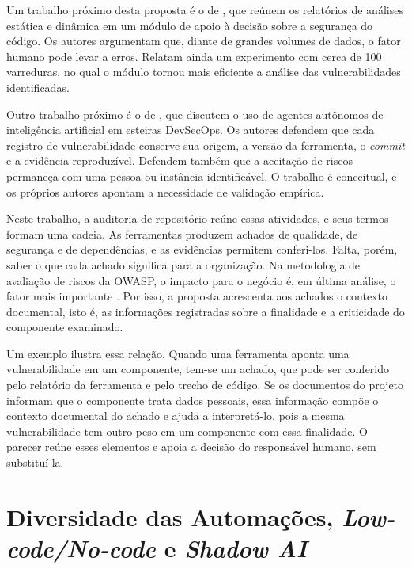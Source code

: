 Um trabalho próximo desta proposta é o de , que reúnem os relatórios de análises estática e dinâmica em um módulo de apoio à decisão sobre a segurança do código. Os autores argumentam que, diante de grandes volumes de dados, o fator humano pode levar a erros. Relatam ainda um experimento com cerca de 100 varreduras, no qual o módulo tornou mais eficiente a análise das vulnerabilidades identificadas.

Outro trabalho próximo é o de , que discutem o uso de agentes autônomos de inteligência artificial em esteiras DevSecOps. Os autores defendem que cada registro de vulnerabilidade conserve sua origem, a versão da ferramenta, o \textit{commit} e a evidência reproduzível. Defendem também que a aceitação de riscos permaneça com uma pessoa ou instância identificável. O trabalho é conceitual, e os próprios autores apontam a necessidade de validação empírica.

Neste trabalho, a auditoria de repositório reúne essas atividades, e seus termos formam uma cadeia. As ferramentas produzem achados de qualidade, de segurança e de dependências, e as evidências permitem conferi-los. Falta, porém, saber o que cada achado significa para a organização. Na metodologia de avaliação de riscos da OWASP, o impacto para o negócio é, em última análise, o fator mais importante \cite{owaspRiskRating}. Por isso, a proposta acrescenta aos achados o contexto documental, isto é, as informações registradas sobre a finalidade e a criticidade do componente examinado.

Um exemplo ilustra essa relação. %
Quando uma ferramenta aponta uma vulnerabilidade em um componente, tem-se um achado, que pode ser conferido pelo relatório da ferramenta e pelo trecho de código. Se os documentos do projeto informam que o componente trata dados pessoais, essa informação compõe o contexto documental do achado e ajuda a interpretá-lo, pois a mesma vulnerabilidade tem outro peso em um componente com essa finalidade. O parecer reúne esses elementos e apoia a decisão do responsável humano, sem substituí-la.

\section{Diversidade das Automações, \textit{Low-code/No-code} e \textit{Shadow AI}}
\label{rt-2-2}

